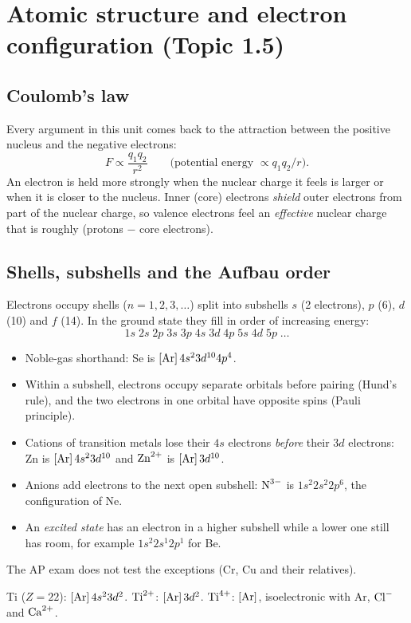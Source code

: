 \documentclass[11pt]{article}
\begin{document}
\section{Atomic structure and electron configuration (Topic 1.5)}\label{t:1.5}
\subsection{Coulomb's law}
Every argument in this unit comes back to the attraction between the positive nucleus and the negative electrons:
\[ F \propto \frac{q_1 q_2}{r^2} \qquad\text{(potential energy } \propto q_1q_2/r\text{)}. \]
An electron is held more strongly when the nuclear charge it feels is larger or when it is closer to the nucleus. Inner (core) electrons \emph{shield} outer electrons from part of the nuclear charge, so valence electrons feel an \emph{effective} nuclear charge that is roughly (protons $-$ core electrons).

\subsection{Shells, subshells and the Aufbau order}
Electrons occupy shells ($n = 1, 2, 3, \dots$) split into subshells $s$ (2 electrons), $p$ (6), $d$ (10) and $f$ (14). In the ground state they fill in order of increasing energy:
\[ 1s\;2s\;2p\;3s\;3p\;4s\;3d\;4p\;5s\;4d\;5p\;\dots \]
\begin{itemize}
\item Noble-gas shorthand: Se is $[\ce{Ar}]\,4s^2 3d^{10} 4p^4$.
\item Within a subshell, electrons occupy separate orbitals before pairing (Hund's rule), and the two electrons in one orbital have opposite spins (Pauli principle).
\item Cations of transition metals lose their $4s$ electrons \emph{before} their $3d$ electrons: Zn is $[\ce{Ar}]\,4s^2 3d^{10}$ and $\ce{Zn^2+}$ is $[\ce{Ar}]\,3d^{10}$.
\item Anions add electrons to the next open subshell: $\ce{N^3-}$ is $1s^2 2s^2 2p^6$, the configuration of Ne.
\item An \emph{excited state} has an electron in a higher subshell while a lower one still has room, for example $1s^2 2s^1 2p^1$ for Be.
\end{itemize}
The AP exam does not test the exceptions (Cr, Cu and their relatives).

 Ti ($Z = 22$): $[\ce{Ar}]\,4s^2 3d^2$. $\ce{Ti^2+}$: $[\ce{Ar}]\,3d^2$. $\ce{Ti^4+}$: $[\ce{Ar}]$, isoelectronic with Ar, $\ce{Cl-}$ and $\ce{Ca^2+}$.
\end{document}
